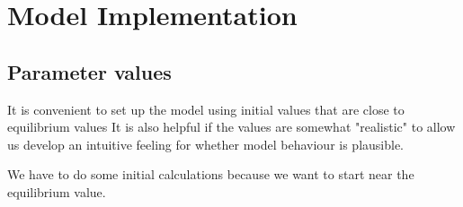 \chapter[Model Implementation]{Model Implementation}
\label{appendix-model-implementation}


\section{Parameter values}
It is convenient to set up the model using initial values that are close to equilibrium values It is also helpful if the values are somewhat "realistic" to allow us develop an intuitive feeling for whether  model behaviour  is plausible. 

We have to do some initial calculations because we want to start near the equilibrium value. 



